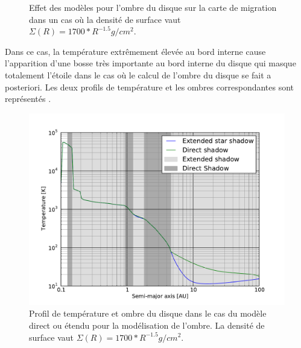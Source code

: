 \begin{figure}[htbp]
\centering
{}\hfill
{}
\caption[Influence de l'ombre sur la carte de migration d'un disque massif.]{Effet des modèles pour l'ombre du disque sur la
carte de migration dans un cas où la densité de surface vaut $\Sigma(R) = 1700 * R^{-1.5}\unit{g/cm^2}$.
}\label{fig:shadow-example}
\end{figure}

Dans ce cas, la température extrêmement élevée au bord interne cause l'apparition d'une bosse très importante au bord interne du disque qui masque totalement l'étoile dans le cas où le calcul de l'ombre du disque se fait a posteriori. Les deux profils de température et les ombres correspondantes sont représentés . 

\begin{figure}[htbp]
\centering
\includegraphics[width=0.65\linewidth]{figure/shadow/example_shadow_temp_profile.pdf}
\caption[Influence de l'ombre sur le profil de température d'un disque massif.]{Profil de température et ombre du disque dans le
cas du modèle direct ou étendu pour la modélisation de l'ombre. La densité de surface vaut $\Sigma(R) = 1700 *
R^{-1.5}\unit{g/cm^2}$. }\label{fig:example_shadow_temp_profile}
\end{figure}

